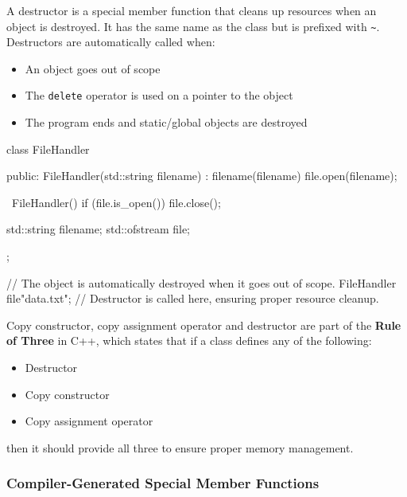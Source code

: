 A destructor is a special member function that cleans up resources when an object is destroyed. It has the same name as the class but is prefixed with \texttt{\textasciitilde}. Destructors are automatically called when:
\begin{itemize}
    \item An object goes out of scope
    \item The \texttt{delete} operator is used on a pointer to the object
    \item The program ends and static/global objects are destroyed
\end{itemize}

\vspace{-0.5em}

\begin{codeblock}[language=C++]
class FileHandler {
public:
    FileHandler(std::string filename) : filename(filename) {
        file.open(filename);
    }

    ~FileHandler() {
        if (file.is_open()) { file.close(); }
    }

    std::string filename;
    std::ofstream file;
};

{ // The object is automatically destroyed when it goes out of scope.
    FileHandler file{"data.txt"};
} // Destructor is called here, ensuring proper resource cleanup.
\end{codeblock}

\vspace{-0.7em}

\begin{observationblock}
    Copy constructor, copy assignment operator and destructor are part of the \textbf{Rule of Three} in C++, which states that if a class defines any of the following:
    \begin{itemize}
        \item Destructor
        \item Copy constructor
        \item Copy assignment operator
    \end{itemize}
    then it should provide all three to ensure proper memory management.
\end{observationblock}

\vspace{-0.8em}

\subsubsection{Compiler-Generated Special Member Functions}

